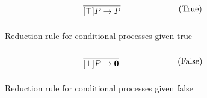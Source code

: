\begin{figure}[h]
	\begin{align}
	& \infrule{}{[\top]P\ra P} \tag{True}
	\end{align}
	\caption{Reduction rule for conditional processes given true}
	\label{fig:true}
\end{figure}

\begin{figure}[h]
	\begin{align}
	& \infrule{}{[\bot]P\ra \nil} \tag{False}
	\end{align}
	\caption{Reduction rule for conditional processes given false}
	\label{fig:false}
\end{figure}

\FloatBarrier



